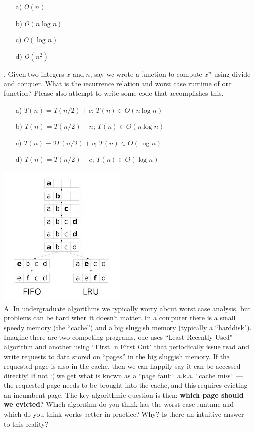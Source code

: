 \documentclass[12pt]{article}
\begin{document}
\begin{enumerate}
    \item[a)]$O(n)$
    \item[b)]$O(n\log{n})$
    \item[c)]$O(\log{n})$
    \item[d)]$O(n^2)$
\end{enumerate}
. Given two integers $x$ and $n$, say we wrote a function to compute $x^n$ using divide and conquer. What is the recurrence relation and worst case runtime of our function? Please also attempt to write some code that accomplishes this.
\begin{enumerate}
    \item[a)]$T(n) = T(n/2) + c$; $T(n) \in O(n\log{n})$
    \item[b)]$T(n) = T(n/2) + n$; $T(n) \in O(n\log{n})$
    \item[c)] $T(n) = 2T(n/2) + c$; $T(n) \in O(\log{n})$
    \item[d)]$T(n) = T(n/2) + c$; $T(n) \in O(\log{n})$
\end{enumerate}
\newpage
\noindent \includegraphics{fifolru.jpg}\\
A. In undergraduate algorithms we typically worry about worst case analysis, but problems can be hard when it doesn't matter. In a computer there is a small speedy memory (the ``cache”) and a big sluggish memory (typically a ``harddisk"). Imagine there are two competing programs, one uses ``Least Recently Used" algorithm and another using ``First In First Out" that periodically issue read and write requests to data stored on ``pages” in the big sluggish memory. If the requested page is also in the cache, then we can happily say it can be accessed directly! If not :( we get what is known as a ``page fault” a.k.a. ``cache miss” — the requested page needs to be brought into the cache, and this requires evicting an incumbent page. The key algorithmic question is then: \textbf{which page should we evicted}? Which algorithm do you think has the worst case runtime and which do you think works better in practice? Why? Is there an intuitive answer to this reality?\\
\end{document}
